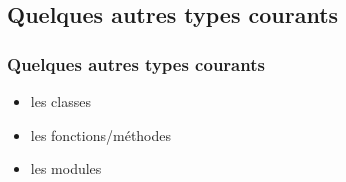 
\subsection{Quelques autres types courants}
\begin{frame}
  \frametitle{Quelques autres types courants}
    \begin{itemize}
      \item les classes
      \item les fonctions/méthodes
      \item les modules
    \end{itemize}
\end{frame}

